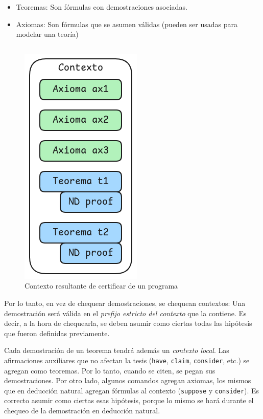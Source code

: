 \begin{itemize}
    \item Teoremas: Son fórmulas con demostraciones asociadas.
    \item Axiomas: Son fórmulas que se asumen válidas (pueden ser usadas para
    modelar una teoría)
\end{itemize}

\begin{figure}[H]
    \centering
    \begin{multicols}{2}
        \begin{tabular}{c}
            
        \end{tabular}
        \includegraphics[scale=0.5]{img/ppa-context.png}
    \end{multicols}
    \caption{Contexto resultante de certificar de un programa}
\end{figure}


Por lo tanto, en vez de chequear demostraciones, se chequean contextos: Una
demostración será válida en el \textit{prefijo estricto del contexto} que la
contiene. Es decir, a la hora de chequearla, se deben asumir como ciertas todas
las hipótesis que fueron definidas previamente.

Cada demostración de un teorema tendrá además un \textit{contexto local}. Las
afirmaciones auxiliares que no afectan la tesis (\lstinline{have},
\lstinline{claim}, \lstinline{consider}, etc.) se agregan como teoremas. Por lo
tanto, cuando se citen, se pegan sus demostraciones. Por otro lado, algunos
comandos agregan axiomas, los mismos que en deducción natural agregan fórmulas
al contexto (\lstinline{suppose} y \lstinline{consider}). Es correcto asumir
como ciertas esas hipótesis, porque lo mismo se hará durante el chequeo de la
demostración en deducción natural.

